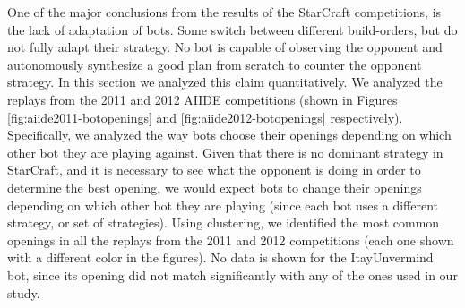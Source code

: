 \documentclass[journal]{IEEEtran}
\begin{document}
One of the major conclusions from the results of the StarCraft competitions, is the lack of adaptation of bots.  Some switch between different build-orders, but do not fully adapt their strategy. No bot is capable of observing the opponent and autonomously synthesize a good plan from scratch to counter the opponent strategy. In this section we analyzed this claim quantitatively. We analyzed the replays from the 2011 and 2012 AIIDE competitions (shown in Figures \ref{fig:aiide2011-botopenings} and \ref{fig:aiide2012-botopenings} respectively). Specifically, we analyzed the way bots choose their openings depending on which other bot they are playing against. Given that there is no dominant strategy in StarCraft, and it is necessary to see what the opponent is doing in order to determine the best opening, we would expect bots to change their openings depending on which other bot they are playing (since each bot uses a different strategy, or set of strategies). Using clustering, we identified the most common openings in all the replays from the 2011 and 2012 competitions (each one shown with a different color in the figures). No data is shown for the ItayUnvermind bot, since its opening did not match significantly with any of the ones used in our study.
\end{document}
